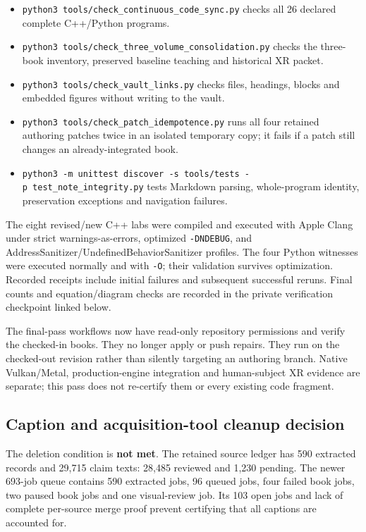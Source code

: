\begin{itemize}
\tightlist
\item
  \texttt{python3\ tools/check\_continuous\_code\_sync.py} checks all 26 declared complete C++/Python programs.
\item
  \texttt{python3\ tools/check\_three\_volume\_consolidation.py} checks the three-book inventory, preserved baseline teaching and historical XR packet.
\item
  \texttt{python3\ tools/check\_vault\_links.py} checks files, headings, blocks and embedded figures without writing to the vault.
\item
  \texttt{python3\ tools/check\_patch\_idempotence.py} runs all four retained authoring patches twice in an isolated temporary copy; it fails if a patch still changes an already-integrated book.
\item
  \texttt{python3\ -m\ unittest\ discover\ -s\ tools/tests\ -p\ test\_note\_integrity.py} tests Markdown parsing, whole-program identity, preservation exceptions and navigation failures.
\end{itemize}

The eight revised/new C++ labs were compiled and executed with Apple Clang under strict warnings-as-errors, optimized \texttt{-DNDEBUG}, and AddressSanitizer/UndefinedBehaviorSanitizer profiles. The four Python witnesses were executed normally and with \texttt{-O}; their validation survives optimization. Recorded receipts include initial failures and subsequent successful reruns. Final counts and equation/diagram checks are recorded in the private verification checkpoint linked below.

The final-pass workflows now have read-only repository permissions and verify the checked-in books. They no longer apply or push repairs. They run on the checked-out revision rather than silently targeting an authoring branch. Native Vulkan/Metal, production-engine integration and human-subject XR evidence are separate; this pass does not re-certify them or every existing code fragment.

\subsection{Caption and acquisition-tool cleanup decision}\label{appendix-faa2b5a8e820-caption-and-acquisition-tool-cleanup-decision}

The deletion condition is \textbf{not met}. The retained source ledger has 590 extracted records and 29,715 claim texts: 28,485 reviewed and 1,230 pending. The newer 693-job queue contains 590 extracted jobs, 96 queued jobs, four failed book jobs, two paused book jobs and one visual-review job. Its 103 open jobs and lack of complete per-source merge proof prevent certifying that all captions are accounted for.

